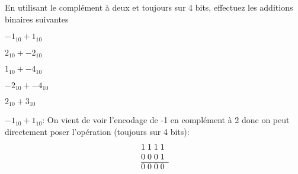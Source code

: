 \documentclass[12pt]{article}
\begin{document}
	\begin{MonExo}
		En utilisant le complément à deux et toujours sur 4 bits, effectuez les additions binaires suivantes
		\begin{alphenum}
			\item $-1_{10} + 1_{10}$
			\item $2_{10} + -2_{10}$
			\item $1_{10} + -4_{10}$
			\item $-2_{10} + -4_{10}$
			\item $2_{10} + 3_{10}$
		\end{alphenum}
	\end{MonExo}
	\begin{MaReponse}
		\begin{alphenum}
			\item $-1_{10} + 1_{10}$: On vient de voir l'encodage de -1 en complément à 2 donc on peut directement poser l'opération (toujours sur 4 bits):
			\[
			\begin{array}{@{}r *{4}{@{\;}c}}
				& 1 & 1 & 1 & 1 \\
				& 0 & 0 & 0 & 1  \\
				\cline{2-5}
				& 0 & 0 & 0 & 0 \\
			\end{array}
			\]
						

\end{alphenum}
\end{MaReponse}
\end{document}
